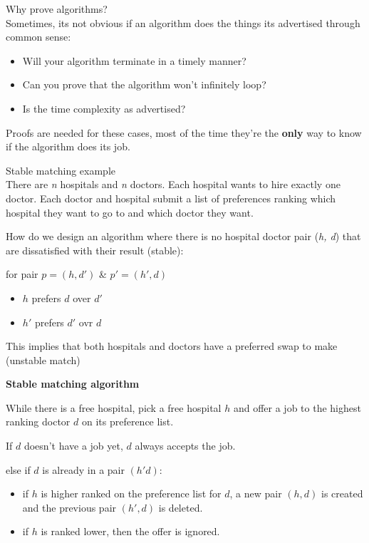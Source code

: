 \documentclass[journal, letterpaper]{IEEEtran}
\begin{document}
\begin{theory}{Why prove algorithms?} \\
    Sometimes, its not obvious if an algorithm does the things its advertised through common sense:
    \begin{itemize}
        \item Will your algorithm terminate in a timely manner?
        \item Can you prove that the algorithm won't infinitely loop?
        \item Is the time complexity as advertised?
    \end{itemize}
    Proofs are needed for these cases, most of the time they're the \textbf{only} way to know if the algorithm does its job.
\end{theory}

\begin{example}{Stable matching example} \\
    There are \textit{n} hospitals and \textit{n} doctors. Each hospital wants to hire exactly one doctor. Each doctor and hospital submit a list of preferences ranking which hospital they want to go to and which doctor they want.

    How do we design an algorithm where there is no hospital doctor pair (\textit{h, d}) that are dissatisfied with their result (stable):

    \begin{center}
        for pair $p = (h, d')$ \& $p' = (h', d)$\\
        \begin{itemize}
            \item $h$ prefers $d$ over $d'$
            \item $h'$ prefers $d'$ ovr $d$
        \end{itemize}
    \end{center}
    This implies that both hospitals and doctors have a preferred swap to make (unstable
    match) \par
    \bigskip
    \noindent\textbf{Stable matching algorithm} \par
    \noindent While there is a free hospital, pick a free hospital $h$ and offer a job to the highest
    ranking doctor $d$ on its preference list. \par
    \bigskip
    \noindent If $d$ doesn't have a job yet, $d$ always accepts the job.\par
    \par
    else if $d$ is already in a pair $(h' d)$:
    \begin{itemize}
        \item{if $h$ is higher ranked on the preference list for $d$, a new pair $(h, d)$ is
            created and the previous pair $(h', d)$ is deleted.}
        \item{if $h$ is ranked lower, then the offer is ignored.}\par
    \end{itemize}


\end{example}
\end{document}
